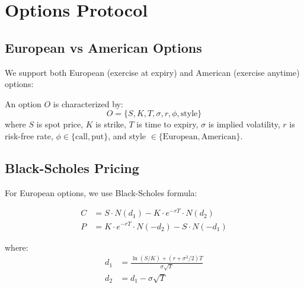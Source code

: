 \section{Options Protocol}


\subsection{European vs American Options}

We support both European (exercise at expiry) and American (exercise anytime) options:

\begin{definition}
An option $O$ is characterized by:
\begin{equation}
O = \{S, K, T, \sigma, r, \phi, \text{style}\}
\end{equation}
where $S$ is spot price, $K$ is strike, $T$ is time to expiry, $\sigma$ is implied volatility, $r$ is risk-free rate, $\phi \in \{\text{call}, \text{put}\}$, and style $\in \{\text{European}, \text{American}\}$.
\end{definition}

\subsection{Black-Scholes Pricing}

For European options, we use Black-Scholes formula:

\begin{align}
C &= S \cdot N(d_1) - K \cdot e^{-rT} \cdot N(d_2) \\
P &= K \cdot e^{-rT} \cdot N(-d_2) - S \cdot N(-d_1)
\end{align}

where:
\begin{align}
d_1 &= \frac{\ln(S/K) + (r + \sigma^2/2)T}{\sigma\sqrt{T}} \\
d_2 &= d_1 - \sigma\sqrt{T}
\end{align}

